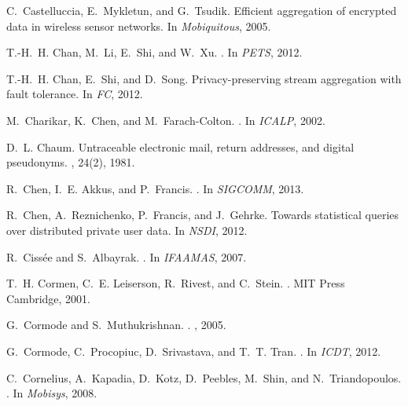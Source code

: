 \documentclass[conference]{IEEEtran}
\begin{document}
\begin{thebibliography}{10}
C.~Castelluccia, E.~Mykletun, and G.~Tsudik.
\newblock Efficient aggregation of encrypted data in wireless sensor networks.
\newblock In {\em Mobiquitous}, 2005.

T.-H.~H. Chan, M.~Li, E.~Shi, and W.~Xu.
.
\newblock In {\em PETS}, 2012.

T.-H.~H. Chan, E.~Shi, and D.~Song.
\newblock Privacy-preserving stream aggregation with fault tolerance.
\newblock In {\em FC}, 2012.

M.~Charikar, K.~Chen, and M.~Farach{-}Colton.
.
\newblock In {\em ICALP}, 2002.

D.~L. Chaum.
\newblock Untraceable electronic mail, return addresses, and digital
  pseudonyms.
, 24(2), 1981.

R.~Chen, I.~E. Akkus, and P.~Francis.
.
\newblock In {\em SIGCOMM}, 2013.

R.~Chen, A.~Reznichenko, P.~Francis, and J.~Gehrke.
\newblock Towards statistical queries over distributed private user data.
\newblock In {\em NSDI}, 2012.

R.~Ciss{\'e}e and S.~Albayrak.
.
\newblock In {\em IFAAMAS}, 2007.

T.~H. Cormen, C.~E. Leiserson, R.~Rivest, and C.~Stein.
.
\newblock MIT Press Cambridge, 2001.

G.~Cormode and S.~Muthukrishnan.
.
, 2005.

G.~Cormode, C.~Procopiuc, D.~Srivastava, and T.~T. Tran.
.
\newblock In {\em ICDT}, 2012.

C.~Cornelius, A.~Kapadia, D.~Kotz, D.~Peebles, M.~Shin, and N.~Triandopoulos.
.
\newblock In {\em Mobisys}, 2008.


\end{thebibliography}
\end{document}

